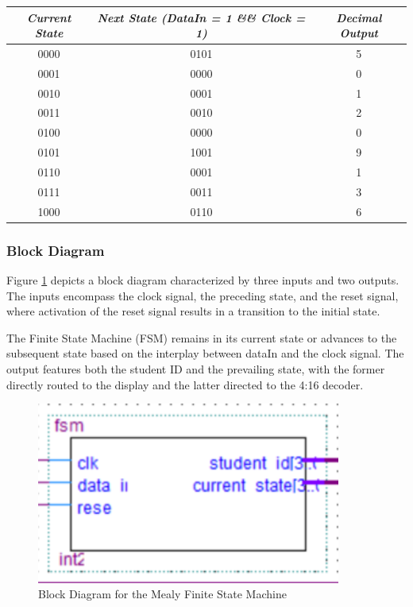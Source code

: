 		\begin{table}[!ht]
			\centering
			\begin{tabular}{|c|c|c|}
			\hline
			\hline
				\textit{Current State} & \textit{Next State (DataIn = 1 \&\& Clock = 1)} & \textit{Decimal Output} \\ 
				\hline
				\hline
				0000 & 0101 & 5 \\ \hline
				0001 & 0000 & 0 \\ \hline
				0010 & 0001 & 1 \\ \hline
				0011 & 0010 & 2 \\ \hline
				0100 & 0000 & 0 \\ \hline
				0101 & 1001 & 9 \\ \hline
				0110 & 0001 & 1 \\ \hline
				0111 & 0011 & 3 \\ \hline
				1000 & 0110 & 6 \\ \hline
			\hline
			\end{tabular}
		\end{table}
	
	\subsubsection{{Block Diagram}}
	
		{Figure \ref{FSM} depicts a block diagram characterized by three inputs and two outputs. The inputs encompass the clock signal, the preceding state, and the reset signal, where activation of the reset signal results in a transition to the initial state.}
		
		{The Finite State Machine (FSM) remains in its current state or advances to the subsequent state based on the interplay between dataIn and the clock signal. The output features both the student ID and the prevailing state, with the former directly routed to the display and the latter directed to the 4:16 decoder.}

		\begin{figure}[H]
			\centering
			\includegraphics[width=10cm]{Pictures/FSM.png}
			\caption{{Block Diagram for the Mealy Finite State Machine}}
			\label{FSM}
		\end{figure}
	
